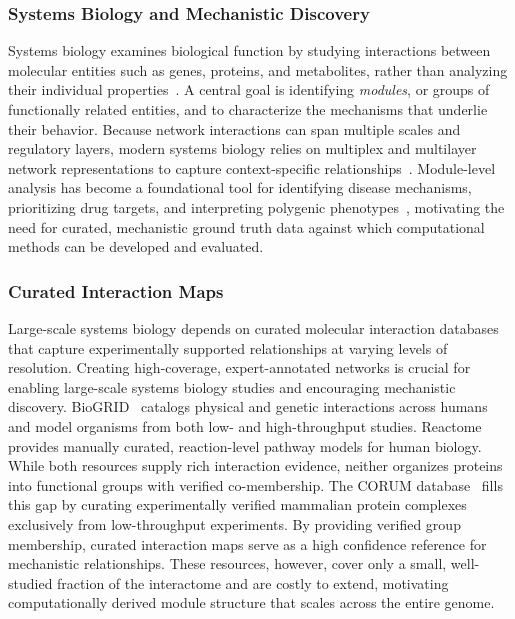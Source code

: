 \documentclass[thesis,letterpaper,12pt]{utthesis}
\begin{document}
\subsubsection{Systems Biology and Mechanistic Discovery}
Systems biology examines biological function by studying interactions between molecular entities such as genes, proteins, and metabolites, rather than analyzing their individual properties~\cite{hartwell1999molecular, barabasi2004network}. A central goal is identifying \textit{modules}, or groups of functionally related entities, and to characterize the mechanisms that underlie their behavior. Because network interactions can span multiple scales and regulatory layers, modern systems biology relies on multiplex and multilayer network representations to capture context-specific relationships~\cite{barabasi2011network, ideker2012differential}. Module-level analysis has become a foundational tool for identifying disease mechanisms, prioritizing drug targets, and interpreting polygenic phenotypes~\cite{menche2015uncovering}, motivating the need for curated, mechanistic ground truth data against which computational methods can be developed and evaluated.

\subsubsection{Curated Interaction Maps}
Large-scale systems biology depends on curated molecular interaction databases that capture experimentally supported relationships at varying levels of resolution. Creating high-coverage, expert-annotated networks is crucial for enabling large-scale systems biology studies and encouraging mechanistic discovery.  BioGRID~\cite{oughtred2021biogrid} catalogs physical and genetic interactions across humans and model organisms from both low- and high-throughput studies. Reactome~\cite{reactome, gillespie2022reactome} provides manually curated, reaction-level pathway models for human biology. While both resources supply rich interaction evidence, neither organizes proteins into functional groups with verified co-membership. The CORUM database~\cite{giurgiu2019corum, tsitsiridis2023corum} fills this gap by curating experimentally verified mammalian protein complexes exclusively from low-throughput experiments. By providing verified group membership, curated interaction maps serve as a high confidence reference for mechanistic relationships. These resources, however, cover only a small, well-studied fraction of the interactome and are costly to extend, motivating computationally derived module structure that scales across the entire genome. 
\end{document}
